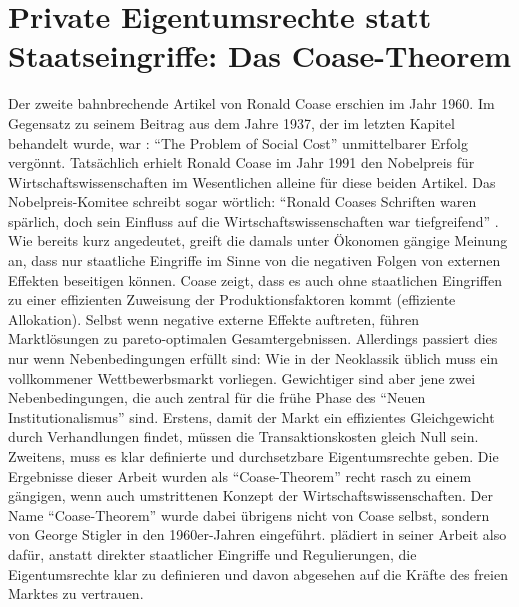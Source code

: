 \section{Private Eigentumsrechte statt Staatseingriffe: Das Coase-Theorem}
\label{Coase-Theorem}

Der zweite bahnbrechende Artikel von Ronald Coase erschien im Jahr 1960. Im Gegensatz zu seinem Beitrag aus dem Jahre 1937, der im letzten Kapitel behandelt wurde, war \textcite{Coase1960}: "`The Problem of Social Cost"' unmittelbarer Erfolg vergönnt. Tatsächlich erhielt Ronald Coase im Jahr 1991 den Nobelpreis für Wirtschaftswissenschaften im Wesentlichen alleine für diese beiden Artikel. Das Nobelpreis-Komitee schreibt sogar wörtlich: "`Ronald Coases Schriften waren spärlich, doch sein Einfluss auf die Wirtschaftswissenschaften war tiefgreifend"' \parencite{Coase1991a}. Wie bereits kurz angedeutet, greift \textcite[S. 1]{Coase1960} die damals unter Ökonomen gängige Meinung an, dass nur staatliche Eingriffe im Sinne von \textcite{Pigou1920} die negativen Folgen von externen Effekten beseitigen können. Coase zeigt, dass es auch ohne staatlichen Eingriffen zu einer effizienten Zuweisung der Produktionsfaktoren kommt (effiziente Allokation). Selbst wenn negative externe Effekte auftreten, führen Marktlösungen zu pareto-optimalen Gesamtergebnissen. Allerdings passiert dies nur wenn Nebenbedingungen erfüllt sind: Wie in der Neoklassik üblich muss ein vollkommener Wettbewerbsmarkt vorliegen. Gewichtiger sind aber jene zwei Nebenbedingungen, die auch zentral für die frühe Phase des "`Neuen Institutionalismus"' sind. Erstens, damit der Markt ein effizientes Gleichgewicht durch Verhandlungen findet, müssen die Transaktionskosten gleich Null sein. Zweitens, muss es klar definierte und durchsetzbare Eigentumsrechte geben. Die Ergebnisse dieser Arbeit wurden als "`Coase-Theorem"' recht rasch zu einem gängigen, wenn auch umstrittenen Konzept der Wirtschaftswissenschaften. Der Name "`Coase-Theorem"' wurde dabei übrigens nicht von Coase selbst, sondern von George Stigler \parencite{Coase1991} in den 1960er-Jahren eingeführt. \textcite{Coase1960} plädiert in seiner Arbeit also dafür, anstatt direkter staatlicher Eingriffe und Regulierungen, die Eigentumsrechte klar zu definieren und davon abgesehen auf die Kräfte des freien Marktes zu vertrauen. 

